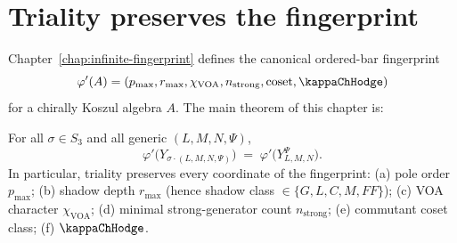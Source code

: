 \section{Triality preserves the fingerprint}
\label{sec:triality-fingerprint}

Chapter~\ref{chap:infinite-fingerprint} defines the canonical
ordered-bar fingerprint
\[
\varphi'(A) =
(p_{\max}, r_{\max}, \chi_{\mathrm{VOA}},
n_{\mathrm{strong}}, \mathrm{coset}, \kappaChHodge)
\]
for a chirally Koszul algebra $A$. The main theorem of this chapter is:

\begin{theorem}
\label{thm:triality-preserves-fingerprint}
For all $\sigma \in S_3$ and all generic $(L,M,N,\Psi)$,
\[
\varphi'\bigl(Y_{\sigma\cdot(L,M,N,\Psi)}\bigr)
\;=\;
\varphi'\bigl(Y_{L,M,N}^\Psi\bigr).
\]
In particular, triality preserves every coordinate of the
fingerprint:
(a) pole order $p_{\max}$; (b) shadow depth $r_{\max}$ (hence
shadow class $\in \{G, L, C, M, FF\}$); (c) VOA character
$\chi_{\mathrm{VOA}}$; (d) minimal strong-generator count
$n_{\mathrm{strong}}$; (e) commutant coset class;
(f) $\kappaChHodge$.
\end{theorem}

